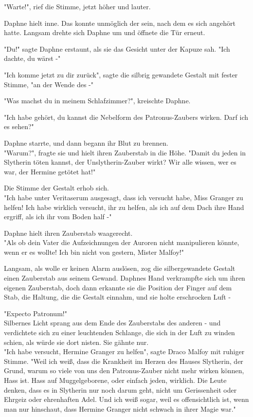 {"Warte!", rief die Stimme, jetzt höher und lauter.

Daphne hielt inne. Das konnte unmöglich der sein, nach dem es sich angehört hatte. Langsam drehte sich Daphne um und öffnete die Tür erneut.

"Du!" sagte Daphne erstaunt, als sie das Gesicht unter der Kapuze sah. "Ich dachte, du wärst -"

"Ich komme jetzt zu dir zurück", sagte die silbrig gewandete Gestalt mit fester Stimme, "an der Wende des -"

"Was machst du in meinem Schlafzimmer?", kreischte Daphne.

"Ich habe gehört, du kannst die Nebelform des Patronus-Zaubers wirken. Darf ich es sehen?"

Daphne starrte, und dann begann ihr Blut zu brennen.\\ "Warum?", fragte sie und hielt ihren Zauberstab in die Höhe. "Damit du jeden in Slytherin töten kannst, der Unslytherin-Zauber wirkt? Wir alle wissen, wer es war, der Hermine getötet hat!"

Die Stimme der Gestalt erhob sich.\\ "Ich habe unter Veritaserum ausgesagt, dass ich versucht habe, Miss Granger zu helfen! Ich habe wirklich versucht, ihr zu helfen, als ich auf dem Dach ihre Hand ergriff, als ich ihr vom Boden half -"

Daphne hielt ihren Zauberstab waagerecht.\\ "Als ob dein Vater die Aufzeichnungen der Auroren nicht manipulieren könnte, wenn er es wollte! Ich bin nicht von gestern, Mister Malfoy!"

Langsam, als wolle er keinen Alarm auslösen, zog die silbergewandete Gestalt einen Zauberstab aus seinem Gewand. Daphnes Hand verkrampfte sich um ihren eigenen Zauberstab, doch dann erkannte sie die Position der Finger auf dem Stab, die Haltung, die die Gestalt einnahm, und sie holte erschrocken Luft -

"Expecto Patronum!"\\ Silbernes Licht sprang aus dem Ende des Zauberstabs des anderen - und verdichtete sich zu einer leuchtenden Schlange, die sich in der Luft zu winden schien, als würde sie dort nisten. Sie gähnte nur.\\ "Ich habe versucht, Hermine Granger zu helfen", sagte Draco Malfoy mit ruhiger Stimme. "Weil ich weiß, dass die Krankheit im Herzen des Hauses Slytherin, der Grund, warum so viele von uns den Patronus-Zauber nicht mehr wirken können, Hass ist. Hass auf Muggelgeborene, oder einfach jeden, wirklich. Die Leute denken, dass es in Slytherin nur noch darum geht, nicht um Gerissenheit oder Ehrgeiz oder ehrenhaften Adel. Und ich weiß sogar, weil es offensichtlich ist, wenn man nur hinschaut, dass Hermine Granger nicht schwach in ihrer Magie war."

}

